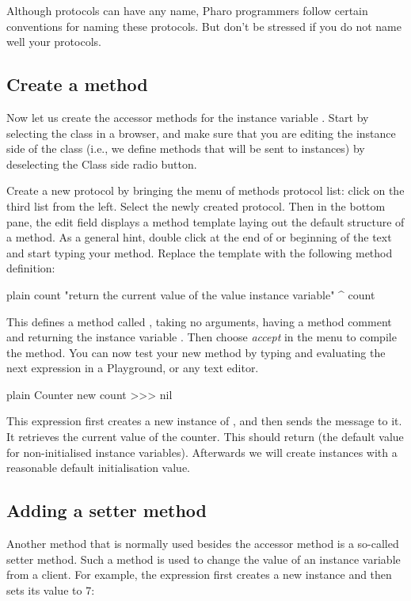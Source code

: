 \documentclass[10pt,twoside,english]{_support/latex/sbabook/sbabook}
\begin{document}
Although protocols can have any name, Pharo programmers follow certain conventions for naming these protocols. But don't be stressed if you do not name well your protocols. 
\subsection{Create a method}
Now let us create the accessor methods for the instance variable . Start by selecting the class  in a browser, and make sure that you are editing the instance side of the class (i.e., we define methods that will be sent to instances) by deselecting the Class side radio button.

Create a new protocol by bringing the menu of methods protocol list: click on the third list from the left. Select the newly created protocol. Then in the bottom pane, the edit field displays a method template laying out the default structure of a method. As a general hint, double click at the end of or beginning of the text and start typing your method.
Replace the template with the following method definition:

\begin{displaycode}{plain}
count
   "return the current value of the value instance variable"
   ^ count
\end{displaycode}

This defines a method called , taking no arguments, having a method comment and returning the instance variable . Then choose \textit{accept} in the menu to compile the method. You can now test your new method by typing and evaluating the next expression in a Playground, or any text editor.

\begin{displaycode}{plain}
Counter new count
>>> nil
\end{displaycode}

This expression first creates a new instance of , and then sends the message  to it. It retrieves the current value of the counter. This should return  (the default value for non-initialised instance variables). Afterwards we will create instances with a reasonable default initialisation value.
\subsection{Adding a setter method}
Another method that is normally used besides the accessor method is a so-called setter method. Such a method is used to change the value of an instance variable from a client. For example, the expression  first creates a new  instance and then sets its value to 7:
\end{document}
